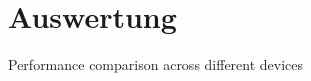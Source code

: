 \section{Auswertung}

\begin{table}[H]
\centering
\caption{Performance comparison across different devices}
\label{tab:performance_comparison}
\begin{adjustbox}{max width=\textwidth}
\renewcommand{\arraystretch}{1.5}

\end{adjustbox}
\end{table}
